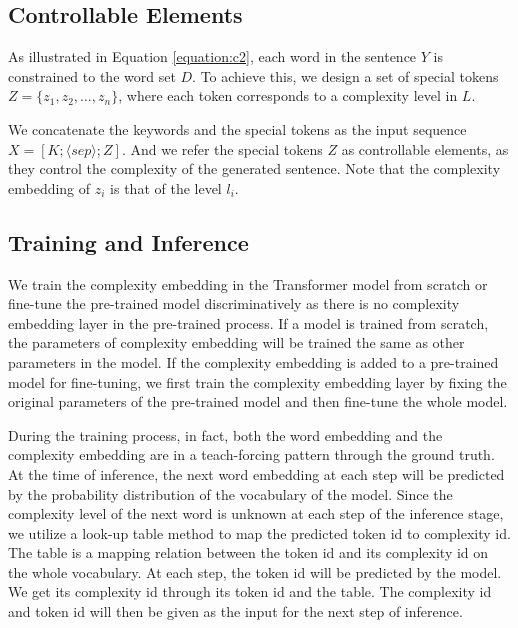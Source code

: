 \documentclass[11pt]{article}
\DeclareMathOperator{\ComTok}{ComTok}
\begin{document}
\subsection{Controllable Elements}
As illustrated in Equation \ref{equation:c2}, each word in the sentence $Y$ is constrained to the word set $D$.
To achieve this, we design a set of special tokens $Z=\{z_1, z_2, \dots, z_n\}$, where each token corresponds to a complexity level in $L$.

We concatenate the keywords and the special tokens as the input sequence $X=[K; \langle sep \rangle; Z]$.
And we refer the special tokens $Z$ as controllable elements, as they control the complexity of the generated sentence.
Note that the complexity embedding of $z_i$ is that of the level $l_i$.

\subsection{Training and Inference}
We train the complexity embedding in the Transformer model from scratch or fine-tune the pre-trained model discriminatively as there is no complexity embedding layer in the pre-trained process. If a model is trained from scratch, the parameters of complexity embedding will be trained the same as other parameters in the model. If the complexity embedding is added to a pre-trained model for fine-tuning, we first train the complexity embedding layer by fixing the original parameters of the pre-trained model and then fine-tune the whole model.

During the training process, in fact, both the word embedding and the complexity embedding are in a teach-forcing pattern through the ground truth. At the time of inference, the next word embedding at each step will be predicted by the probability distribution of the vocabulary of the model. Since the complexity level of the next word is unknown at each step of the inference stage, we utilize a look-up table method to map the predicted token id to complexity id. The table is a mapping relation between the token id and its complexity id on the whole vocabulary. At each step, the token id will be predicted by the model. We get its complexity id through its token id and the table. The complexity id and token id will then be given as the input for the next step of inference.
\end{document}
